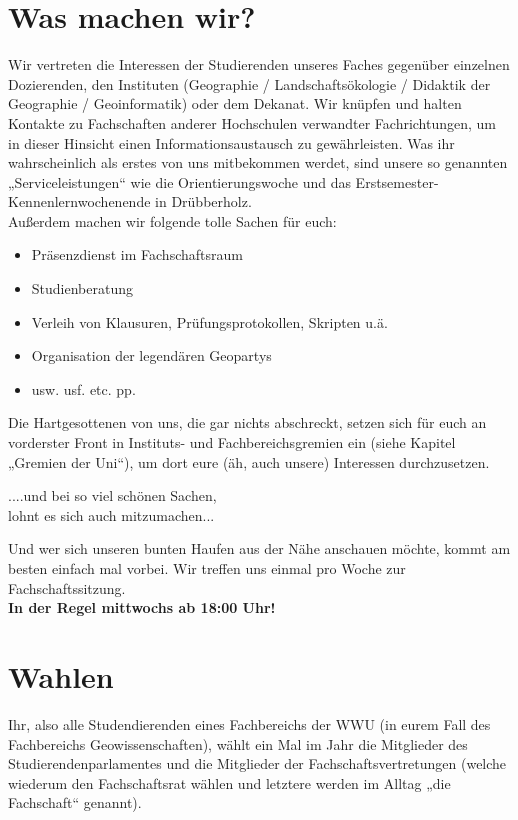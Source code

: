 \section*{Was machen wir?}
Wir vertreten die Interessen der Studierenden unseres Faches gegenüber einzelnen Dozierenden, den Instituten (Geographie / Landschaftsökologie / Didaktik der Geographie / Geoinformatik) oder dem Dekanat. Wir knüpfen und halten Kontakte zu Fachschaften anderer Hochschulen verwandter Fachrichtungen, um in dieser Hinsicht einen Informationsaustausch zu gewährleisten. Was ihr wahrscheinlich als erstes von uns mitbekommen werdet, sind unsere so genannten „Serviceleistungen“ wie die Orientierungswoche und das Erstsemester-Kennenlernwochenende in Drübberholz.
\\
Außerdem machen wir folgende tolle Sachen für euch:
\begin{itemize}
 \item Präsenzdienst im Fachschaftsraum
 \item Studienberatung
 \item Verleih von Klausuren, Prüfungsprotokollen, Skripten u.ä.
 \item Organisation der legendären Geopartys
 \item usw. usf. etc. pp.
\end{itemize}
Die Hartgesottenen von uns, die gar nichts abschreckt, setzen sich für euch an vorderster Front in Instituts- und Fachbereichsgremien ein
(siehe Kapitel „Gremien der Uni“), um dort eure (äh, auch unsere) Interessen durchzusetzen.
\begin{center}
....und bei so viel schönen Sachen,\\
lohnt es sich auch mitzumachen...
\end{center}
Und wer sich unseren bunten Haufen aus der Nähe anschauen möchte, kommt am besten einfach mal vorbei.
Wir treffen uns einmal pro Woche zur Fachschaftssitzung.\\
\textbf{In der Regel mittwochs ab 18:00 Uhr!}

\section*{Wahlen}
Ihr, also alle Studendierenden eines Fachbereichs der WWU (in eurem Fall des Fachbereichs Geowissenschaften), wählt ein Mal im Jahr die Mitglieder des Studierendenparlamentes und die Mitglieder der Fachschaftsvertretungen (welche wiederum den Fachschaftsrat wählen und letztere werden im Alltag „die Fachschaft“ genannt).

